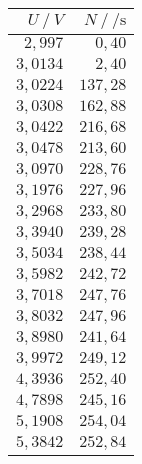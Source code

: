 \begin{tabular}{rr}
	\toprule
	$U ~/~ \si{V}$ & $N ~/~ \si{\per\second}$\\
	\midrule
	$2{,}997$ & $0{,}40$\\
	$3{,}0134$ & $2{,}40$\\
	$3{,}0224$ & $137{,}28$\\
	$3{,}0308$ & $162{,}88$\\
	$3{,}0422$ & $216{,}68$\\
	$3{,}0478$ & $213{,}60$\\
	$3{,}0970$ & $228{,}76$\\
	$3{,}1976$ & $227{,}96$\\
	$3{,}2968$ & $233{,}80$\\
	$3{,}3940$ & $239{,}28$\\
	$3{,}5034$ & $238{,}44$\\
	$3{,}5982$ & $242{,}72$\\
	$3{,}7018$ & $247{,}76$\\
	$3{,}8032$ & $247{,}96$\\
	$3{,}8980$ & $241{,}64$\\
	$3{,}9972$ & $249{,}12$\\
	$4{,}3936$ & $252{,}40$\\
	$4{,}7898$ & $245{,}16$\\
	$5{,}1908$ & $254{,}04$\\
	$5{,}3842$ & $252{,}84$\\
	\bottomrule
\end{tabular}
